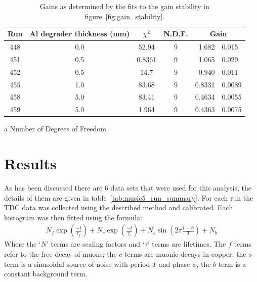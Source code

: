%
\begin{table}
    \begin{center}
        \begin{threeparttable}
            \begin{tabular}{c|c|c|c|r@{ $\pm$ }l}
                Run & Al degrader thickness (mm) & $\chi^2$ 
                                                 & N.D.F. \tnote{a}
                                                 & \multicolumn{2}{|c}{Gain} \\
                \hline
                448  &  0.0  &  52.94   &  9  &  1.682  &  0.015  \\
                451  &  0.5  &  0.8361  &  9  &  1.065  &  0.029  \\
                452  &  0.5  &  14.7    &  9  &  0.940  &  0.011  \\
                455  &  1.0  &  83.68   &  9  &  0.8331 &  0.0089 \\
                458  &  5.0  &  83.41   &  9  &  0.4634 &  0.0055 \\
                459  &  5.0  &  1.964   &  9  &  0.4363 &  0.0075 \\
            \end{tabular}
            \caption{Gains as determined by the fits to the gain stability in figure~\ref{fig:gain_stability}.}
            \begin{tablenotes}
                \item [a] Number of Degrees of Freedom
            \end{tablenotes}
            \label{tab:gain_stability_paramters}
        \end{threeparttable}
    \end{center}
\end{table}

\section{Results} %
\label{sec:results}
As has been discussed there are 6 data sets that were used for this analysis, the details of them are given in table~\ref{tab:music5_run_summary}. For each run the TDC data was collected using the described method and calibrated. Each histogram was then fitted using the formula:
\begin{align}
  N_{f}\exp(\frac{-t}{\tau_{f}}) + N_{c}\exp(\frac{-t}{\tau_{c}}) + N_{s}\sin(2\pi\frac{t-\phi}{T}) + N_{b} \label{equ:fit}
\end{align}
Where the `\(N\)' terms are  scaling factors and `\(\tau\)' terms are lifetimes. The \(f\) terms refer to the free decay of muons; the \(c\) terms are muonic decays in copper; the \(s\) term is a sinusoidal source of noise with period \(T\) and phase \(\phi\), the \(b\) term is a constant background term.

